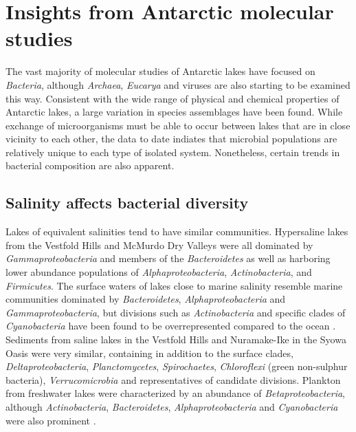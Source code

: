 
\section{Insights from Antarctic molecular studies}
\label{in:insights}
The vast majority of molecular studies of Antarctic lakes have focused on \emph{Bacteria}, although \emph{Archaea}, \emph{Eucarya} and viruses are also starting to be examined this way.
Consistent with the wide range of physical and chemical properties of Antarctic lakes, a large variation in species assemblages have been found.
While exchange of microorganisms must be able to occur between lakes that are in close vicinity to each other, 
 the data to date indiates that microbial populations are relatively unique to each type of isolated system. 
Nonetheless, certain trends in bacterial composition are also apparent.


\subsection{Salinity affects bacterial diversity}

Lakes of equivalent salinities tend to have similar communities.
Hypersaline lakes from the Vestfold Hills \cite{Bowman2000b} and McMurdo Dry Valleys \cite{Glatz2006, Mosier2007} were all dominated by \emph{Gammaproteobacteria} and members of the \emph{Bacteroidetes}
 as well as harboring lower abundance populations of \emph{Alphaproteobacteria}, \emph{Actinobacteria}, and \emph{Firmicutes}.
The surface waters of lakes close to marine salinity resemble marine communities dominated by \emph{Bacteroidetes}, \emph{Alphaproteobacteria} and \emph{Gammaproteobacteria},
 but divisions such as \emph{Actinobacteria} and specific clades of \emph{Cyanobacteria} have been found to be overrepresented compared to the ocean \cite{Lauro2011}.
Sediments from saline lakes in the Vestfold Hills \cite{Bowman2000a} and Nuramake-Ike in the Syowa Oasis \cite{Kurosawa2010} were very similar, 
containing in addition to the surface clades, \emph{Deltaproteobacteria}, \emph{Planctomycetes}, \emph{Spirochaetes}, \emph{Chloroflexi} (green non-sulphur bacteria), \emph{Verrucomicrobia} and representatives of candidate divisions.
Plankton from freshwater lakes were characterized by an abundance of \emph{Betaproteobacteria}, although \emph{Actinobacteria}, \emph{Bacteroidetes}, \emph{Alphaproteobacteria} and \emph{Cyanobacteria} were also prominent \cite{Pearce2003a, Pearce2005a, Pearce2005b, Schiaffino2009}. 


